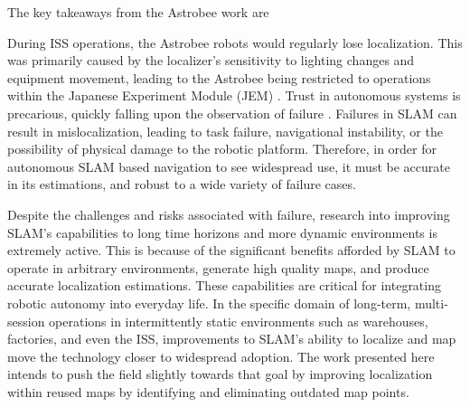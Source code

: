 The key takeaways from the Astrobee work are 


During ISS operations, the Astrobee robots would regularly lose localization. This was primarily caused by the localizer's sensitivity to lighting changes and equipment movement, leading to the Astrobee being restricted to operations within the Japanese Experiment Module (JEM) \cite{carlinoLessonsLearnedAstrobee}. Trust in autonomous systems is precarious, quickly falling upon the observation of failure \cite{robinetteEffectRobotPerformance2017}. Failures in SLAM can result in mislocalization, leading to task failure, navigational instability, or the possibility of physical damage to the robotic platform\cite{nahavandiComprehensiveReviewAutonomous2025a}. Therefore, in order for autonomous SLAM based navigation to see widespread use, it must be accurate in its estimations, and robust to a wide variety of failure cases.


Despite the challenges and risks associated with failure, research into improving SLAM's capabilities to long time horizons and more dynamic environments is extremely active. This is because of the significant benefits afforded by SLAM to operate in arbitrary environments, generate high quality maps, and produce accurate localization estimations. These capabilities are critical for integrating robotic autonomy into everyday life. In the specific domain of long-term, multi-session operations in intermittently static environments such as warehouses, factories, and even the ISS, improvements to SLAM's ability to localize and map move the technology closer to widespread adoption.  The work presented here intends to push the field slightly towards that goal by improving localization within reused maps by identifying and eliminating outdated map points.